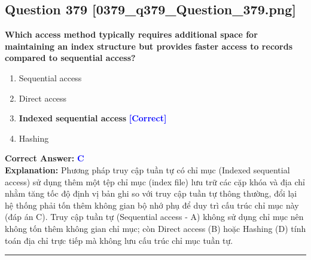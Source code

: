 \documentclass[11pt,a4paper]{article}
\begin{document}
\begin{minipage}{\textwidth}
\subsection*{Question 379 \quad \footnotesize{[0379\_q379\_Question\_379.png]}}
\noindent \textbf{Which access method typically requires additional space for maintaining an index structure but provides faster access to records compared to sequential access?}

\begin{enumerate}[label=\Alph*.]
    \item Sequential access
    \item Direct access
    \item \textbf{Indexed sequential access} \hfill \textcolor{blue}{\textbf{[Correct]}}
    \item Hashing
\end{enumerate}

\noindent \textbf{Correct Answer:} \textcolor{blue}{\textbf{C}} \\[2pt]
\noindent \textbf{Explanation:} Phương pháp truy cập tuần tự có chỉ mục (Indexed sequential access) sử dụng thêm một tệp chỉ mục (index file) lưu trữ các cặp khóa và địa chỉ nhằm tăng tốc độ định vị bản ghi so với truy cập tuần tự thông thường, đổi lại hệ thống phải tốn thêm không gian bộ nhớ phụ để duy trì cấu trúc chỉ mục này (đáp án C). Truy cập tuần tự (Sequential access - A) không sử dụng chỉ mục nên không tốn thêm không gian chỉ mục; còn Direct access (B) hoặc Hashing (D) tính toán địa chỉ trực tiếp mà không lưu cấu trúc chỉ mục tuần tự.

\par\vspace{0.3cm}
\hrule
\vspace{0.3cm}
\end{minipage}
\end{document}
